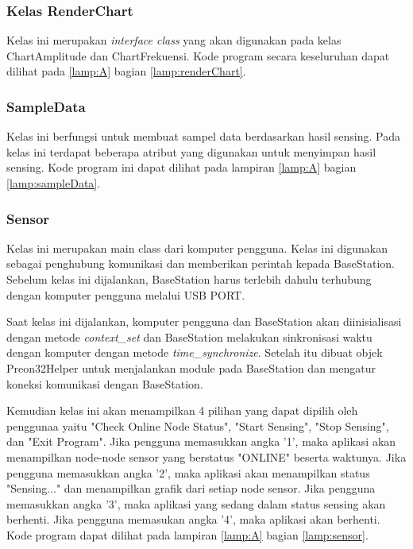 \subsubsection{Kelas RenderChart}
Kelas ini merupakan \textit{interface class} yang akan digunakan pada kelas ChartAmplitude dan ChartFrekuensi. Kode program secara keseluruhan dapat dilihat pada \ref{lamp:A} bagian \ref{lamp:renderChart}.

\subsubsection{SampleData}
Kelas ini berfungsi untuk membuat sampel data berdasarkan hasil sensing. Pada kelas ini terdapat beberapa atribut yang digunakan untuk menyimpan hasil sensing. Kode program ini dapat dilihat pada lampiran \ref{lamp:A} bagian \ref{lamp:sampleData}.

\subsubsection{Sensor}
Kelas ini merupakan main class dari komputer pengguna. Kelas ini digunakan sebagai penghubung komunikasi dan memberikan perintah kepada BaseStation. Sebelum kelas ini dijalankan, BaseStation harus terlebih dahulu terhubung dengan komputer pengguna melalui USB PORT.

Saat kelas ini dijalankan, komputer pengguna dan BaseStation akan diinisialisasi dengan metode \textit{context\_set} dan BaseStation melakukan sinkronisasi waktu dengan komputer dengan metode \textit{time\_synchronize}. Setelah itu dibuat objek Preon32Helper untuk menjalankan module pada BaseStation dan mengatur koneksi komunikasi dengan BaseStation.  

Kemudian kelas ini akan menampilkan 4 pilihan yang dapat dipilih oleh penggunaa yaitu "Check Online Node Status", "Start Sensing", "Stop Sensing", dan "Exit Program". Jika pengguna memasukkan angka '1', maka aplikasi akan menampilkan node-node sensor yang berstatus "ONLINE" beserta waktunya. Jika pengguna memasukkan angka '2', maka aplikasi akan menampilkan status "Sensing..." dan menampilkan grafik dari setiap node sensor. Jika pengguna memasukkan angka '3', maka aplikasi yang sedang dalam status sensing akan berhenti. Jika pengguna memasukan angka '4', maka aplikasi akan berhenti. Kode program dapat dilihat pada lampiran \ref{lamp:A} bagian \ref{lamp:sensor}.

